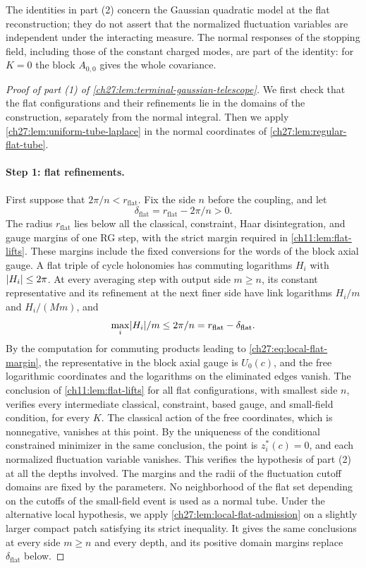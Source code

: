 The identities in part (2) concern the Gaussian quadratic model at the flat reconstruction; they do not assert that the normalized fluctuation variables are independent under the interacting measure. The normal responses of the stopping field, including those of the constant charged modes, are part of the identity: for $K=0$ the block $A_{0,0}$ gives the whole covariance.

\begin{proof}[Proof of part (1) of \cref{ch27:lem:terminal-gaussian-telescope}]
We first check that the flat configurations and their refinements lie in the domains of the construction, separately from the normal integral. Then we apply \cref{ch27:lem:uniform-tube-laplace} in the normal coordinates of \cref{ch27:lem:regular-flat-tube}.

\paragraph{Step 1: flat refinements.}
First suppose that $2\pi/n<r_{\mathrm{flat}}$. Fix the side $n$ before the coupling, and let
\begin{equation}\label{ch27:eq:whole-flat-margin}
 \delta_{\mathrm{flat}}=r_{\mathrm{flat}}-2\pi/n>0.
\end{equation}
The radius $r_{\mathrm{flat}}$ lies below all the classical, constraint, Haar disintegration, and gauge margins of one RG step, with the strict margin required in \cref{ch11:lem:flat-lifts}. These margins include the fixed conversions for the words of the block axial gauge. A flat triple of cycle holonomies has commuting logarithms $H_i$ with $\lvert H_i\rvert\le2\pi$. At every averaging step with output side $m\ge n$, its constant representative and its refinement at the next finer side have link logarithms $H_i/m$ and $H_i/(Mm)$, and
\[
 \max_i\lvert H_i\rvert/m\le2\pi/n=r_{\mathrm{flat}}-\delta_{\mathrm{flat}}.
\]
By the computation for commuting products leading to \eqref{ch27:eq:local-flat-margin}, the representative in the block axial gauge is $U_0(c)$, and the free logarithmic coordinates and the logarithms on the eliminated edges vanish. The conclusion of \cref{ch11:lem:flat-lifts} for all flat configurations, with smallest side $n$, verifies every intermediate classical, constraint, based gauge, and small-field condition, for every $K$. The classical action of the free coordinates, which is nonnegative, vanishes at this point. By the uniqueness of the conditional constrained minimizer in the same conclusion, the point is $z_i^*(c)=0$, and each normalized fluctuation variable vanishes. This verifies the hypothesis of part (2) at all the depths involved. The margins and the radii of the fluctuation cutoff domains are fixed by the parameters. No neighborhood of the flat set depending on the cutoffs of the small-field event is used as a normal tube. Under the alternative local hypothesis, we apply \cref{ch27:lem:local-flat-admission} on a slightly larger compact patch satisfying its strict inequality. It gives the same conclusions at every side $m\ge n$ and every depth, and its positive domain margins replace $\delta_{\mathrm{flat}}$ below.


\end{proof}
